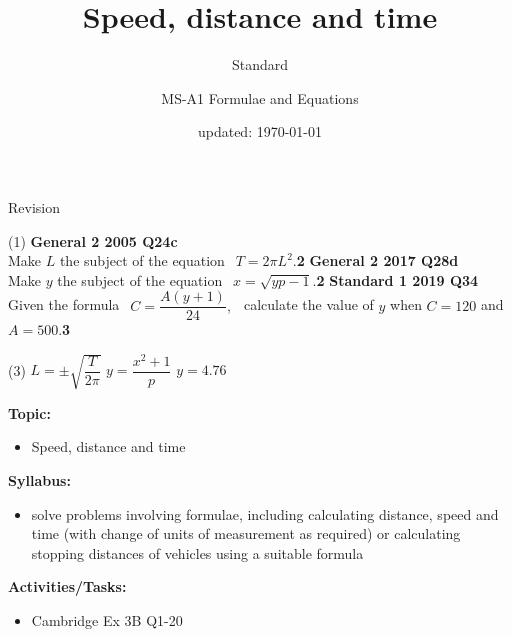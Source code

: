 \documentclass[aspectratio=169,10pt]{beamer}
\title{Speed, distance and time}
\subtitle{Standard}
\author{MS-A1 Formulae and Equations}
\date{updated: \today
}
\begin{document}
\begin{frame}{Revision}
\begin{tasks}(1)
    \task \textbf{General 2 2005 Q24c}\\
    Make $L$ the subject of the equation $\ \ T=2\pi L^2$.\hfill\textbf{2}
    \task \textbf{General 2 2017 Q28d}\\
    Make $y$ the subject of the equation $\ \ x=\sqrt{yp-1}$.\hfill\textbf{2}
    \task \textbf{Standard 1 2019 Q34}\\
    Given the formula $\ \ C=\dfrac{A(y+1)}{24},\ \ $ calculate the value of $y$ when $C=120$ and $A=500$.\hfill\textbf{3}
\end{tasks}\vspace{7pt}\pause
  \begin{solution}[]
    \begin{tasks}(3)
    \task \pause$L=\pm\sqrt{\dfrac{T}{2\pi}}$
    \task \pause$y=\dfrac{x^2+1}{p}$
    \task \pause$y=4.76$
    \end{tasks}
    \end{solution}
\end{frame}

\frame{\titlepage}

\begin{frame}
  \begin{outcome}
    \textbf{Topic:}
    \begin{itemize}
      \item[] Speed, distance and time
    \end{itemize}

    \textbf{Syllabus:}
    \begin{itemize}
      \item solve problems involving formulae, including calculating distance, speed and time (with change of units of measurement as required) or calculating stopping distances of vehicles using a suitable formula
    \end{itemize}

    \textbf{Activities/Tasks:}
    \begin{itemize}
      \item Cambridge Ex 3B Q1-20
    \end{itemize}
  \end{outcome}
\end{frame}
\end{document}
